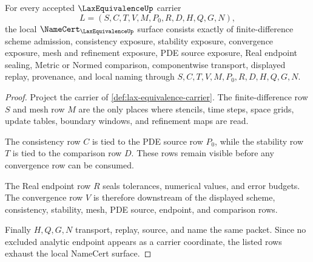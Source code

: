 \begin{theorem}
\label{thm:lax-equivalence-namecert-obligations}
For every accepted $\LaxEquivalenceUp$ carrier
$$
L=(S,C,T,V,M,P_0,R,D,H,Q,G,N),
$$
the local $\NameCert_{\LaxEquivalenceUp}$ surface consists exactly of finite-difference scheme admission, consistency exposure, stability exposure, convergence exposure, mesh and refinement exposure, PDE source exposure, Real endpoint sealing, Metric or Normed comparison, componentwise transport, displayed replay, provenance, and local naming through $S,C,T,V,M,P_0,R,D,H,Q,G,N$.
\end{theorem}
\begin{proof}
Project the carrier of \autoref{def:lax-equivalence-carrier}. The finite-difference row $S$ and mesh row $M$ are the only places where stencils, time steps, space grids, update tables, boundary windows, and refinement maps are read.

The consistency row $C$ is tied to the PDE source row $P_0$, while the stability row $T$ is tied to the comparison row $D$. These rows remain visible before any convergence row can be consumed.

The Real endpoint row $R$ seals tolerances, numerical values, and error budgets. The convergence row $V$ is therefore downstream of the displayed scheme, consistency, stability, mesh, PDE source, endpoint, and comparison rows.

Finally $H,Q,G,N$ transport, replay, source, and name the same packet. Since no excluded analytic endpoint appears as a carrier coordinate, the listed rows exhaust the local NameCert surface.
\end{proof}

